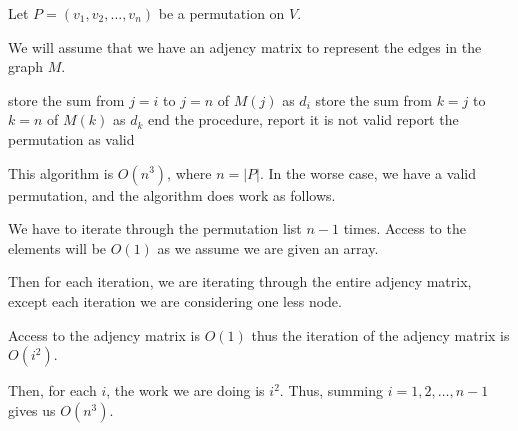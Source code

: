 \begin{soln}
	Let \(P = (v_1, v_2, \dots, v_n)\) be a permutation on \(V\).

	We will assume that we have an adjency matrix to represent the edges in the graph \(M\).

	\begin{algorithmic}[1]
		\State store the sum from $j = i$ to $j = n$ of $M(j)$ as $d_i$
		\State store the sum from $k = j$ to $k = n$ of $M(k)$ as $d_k$
		\State end the procedure, report it is not valid
		\EndIf
		\EndFor
		\EndFor
		\State report the permutation as valid
		\EndProcedure
	\end{algorithmic}
	This algorithm is \(O(n^3)\), where \(n = |P|\). In the worse case, we have a valid permutation, and the algorithm does work as follows.

	We have to iterate through the permutation list \(n - 1\) times. Access to the elements will be \(O(1)\) as we assume we are given an array.

	Then for each iteration, we are iterating through the entire adjency matrix, except each iteration we are considering one less node.

	Access to the adjency matrix is \(O(1)\) thus the iteration of the adjency matrix is \(O(i^2)\).

	Then, for each \(i\), the work we are doing is \(i^2\). Thus, summing \(i = 1, 2, \dots, n - 1\) gives us \(O(n^3)\).


\end{soln}
